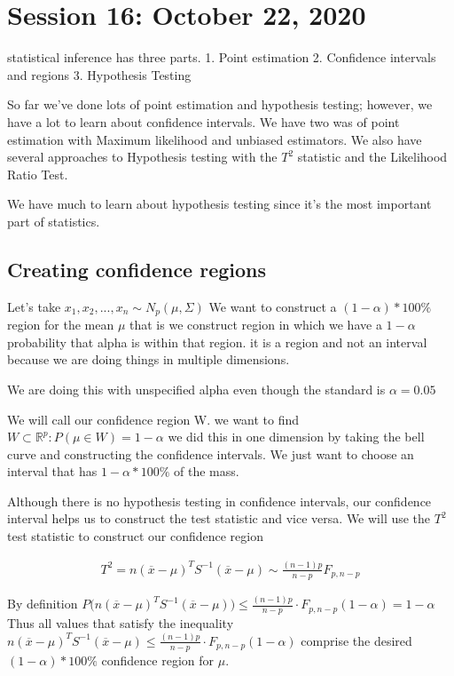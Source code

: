 \chapter{Session 16: October 22, 2020}
statistical inference has three parts. 
1. Point estimation
2. Confidence intervals and regions
3. Hypothesis Testing

So far we've done lots of point estimation and hypothesis testing; however, we have a lot to learn about confidence intervals. We have two was of point estimation with Maximum likelihood and unbiased estimators. We also have several approaches to Hypothesis testing with the $T^2$ statistic and the Likelihood Ratio Test.

We have much to learn about hypothesis testing since it's the most important part of statistics.

\section{Creating confidence regions}
Let's take $x_1,x_2,...,x_n \sim N_p (\mu,\Sigma)$
We want to construct a 
$(1-\alpha)*100\%$ region for the mean $\mu$ that is we construct region in which we have a $1-\alpha$ probability that alpha is within that region. it is a region and not an interval because we are doing things in multiple dimensions.

We are doing this with unspecified alpha even though the standard is $\alpha=0.05$

We will call our confidence region W. we want to find $W\subset \mathbb{R}^p : P(\mu \in W) = 1-\alpha$ we did this in one dimension by taking the bell curve and constructing the confidence intervals. We just want to choose an interval that has $1-\alpha*100\%$ of the mass. 

Although there is no hypothesis testing in confidence intervals, our confidence interval helps us to construct the test statistic and vice versa. We will use the $T^2$ test statistic to construct our confidence region

\begin{gather*}
    T^2 = n(\overline{x}-\mu)^T S^{-1}(\overline{x}-\mu) \sim \frac{(n-1)p}{n-p}F_{p,n-p}
\end{gather*}

By definition
$P\Big( n(\overline{x}-\mu)^T S^{-1}(\overline{x}-\mu) \Big) \leq \frac{(n-1)p}{n-p}\cdot F_{p,n-p}(1-\alpha) = 1-\alpha$
Thus all values that satisfy the inequality $ n(\overline{x}-\mu)^T S^{-1}(\overline{x}-\mu) \leq \frac{(n-1)p}{n-p}\cdot F_{p,n-p}(1-\alpha)$
comprise the desired $(1-\alpha)*100\%$ confidence region for $\mu$.

